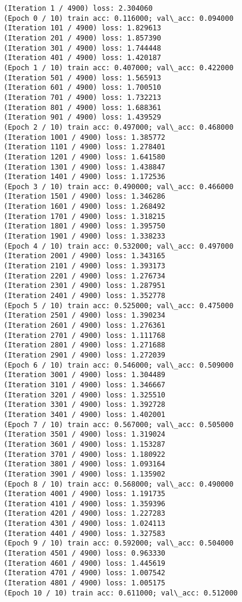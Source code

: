 \documentclass[11pt]{article}
\begin{document}
    \begin{Verbatim}[commandchars=\\\{\}]
(Iteration 1 / 4900) loss: 2.304060
(Epoch 0 / 10) train acc: 0.116000; val\_acc: 0.094000
(Iteration 101 / 4900) loss: 1.829613
(Iteration 201 / 4900) loss: 1.857390
(Iteration 301 / 4900) loss: 1.744448
(Iteration 401 / 4900) loss: 1.420187
(Epoch 1 / 10) train acc: 0.407000; val\_acc: 0.422000
(Iteration 501 / 4900) loss: 1.565913
(Iteration 601 / 4900) loss: 1.700510
(Iteration 701 / 4900) loss: 1.732213
(Iteration 801 / 4900) loss: 1.688361
(Iteration 901 / 4900) loss: 1.439529
(Epoch 2 / 10) train acc: 0.497000; val\_acc: 0.468000
(Iteration 1001 / 4900) loss: 1.385772
(Iteration 1101 / 4900) loss: 1.278401
(Iteration 1201 / 4900) loss: 1.641580
(Iteration 1301 / 4900) loss: 1.438847
(Iteration 1401 / 4900) loss: 1.172536
(Epoch 3 / 10) train acc: 0.490000; val\_acc: 0.466000
(Iteration 1501 / 4900) loss: 1.346286
(Iteration 1601 / 4900) loss: 1.268492
(Iteration 1701 / 4900) loss: 1.318215
(Iteration 1801 / 4900) loss: 1.395750
(Iteration 1901 / 4900) loss: 1.338233
(Epoch 4 / 10) train acc: 0.532000; val\_acc: 0.497000
(Iteration 2001 / 4900) loss: 1.343165
(Iteration 2101 / 4900) loss: 1.393173
(Iteration 2201 / 4900) loss: 1.276734
(Iteration 2301 / 4900) loss: 1.287951
(Iteration 2401 / 4900) loss: 1.352778
(Epoch 5 / 10) train acc: 0.525000; val\_acc: 0.475000
(Iteration 2501 / 4900) loss: 1.390234
(Iteration 2601 / 4900) loss: 1.276361
(Iteration 2701 / 4900) loss: 1.111768
(Iteration 2801 / 4900) loss: 1.271688
(Iteration 2901 / 4900) loss: 1.272039
(Epoch 6 / 10) train acc: 0.546000; val\_acc: 0.509000
(Iteration 3001 / 4900) loss: 1.304489
(Iteration 3101 / 4900) loss: 1.346667
(Iteration 3201 / 4900) loss: 1.325510
(Iteration 3301 / 4900) loss: 1.392728
(Iteration 3401 / 4900) loss: 1.402001
(Epoch 7 / 10) train acc: 0.567000; val\_acc: 0.505000
(Iteration 3501 / 4900) loss: 1.319024
(Iteration 3601 / 4900) loss: 1.153287
(Iteration 3701 / 4900) loss: 1.180922
(Iteration 3801 / 4900) loss: 1.093164
(Iteration 3901 / 4900) loss: 1.135902
(Epoch 8 / 10) train acc: 0.568000; val\_acc: 0.490000
(Iteration 4001 / 4900) loss: 1.191735
(Iteration 4101 / 4900) loss: 1.359396
(Iteration 4201 / 4900) loss: 1.227283
(Iteration 4301 / 4900) loss: 1.024113
(Iteration 4401 / 4900) loss: 1.327583
(Epoch 9 / 10) train acc: 0.592000; val\_acc: 0.504000
(Iteration 4501 / 4900) loss: 0.963330
(Iteration 4601 / 4900) loss: 1.445619
(Iteration 4701 / 4900) loss: 1.007542
(Iteration 4801 / 4900) loss: 1.005175
(Epoch 10 / 10) train acc: 0.611000; val\_acc: 0.512000
    \end{Verbatim}
\end{document}
